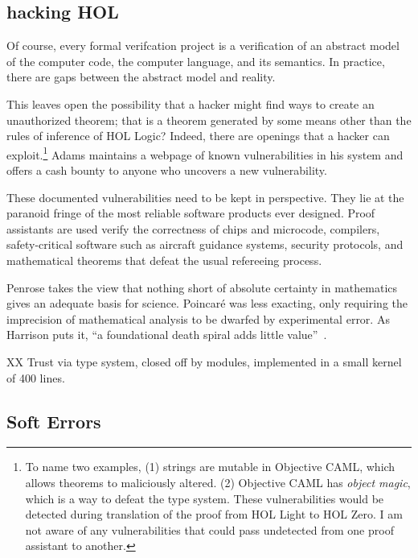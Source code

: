 \documentclass{llncs}
\begin{document}
\subsection{hacking HOL}

Of course, every formal verifcation project is a verification of an
abstract model of the computer code, the computer language, and its
semantics.  In practice, there are gaps between the abstract
model and reality.

  
This leaves open the possibility that a hacker might find ways to
create an unauthorized theorem; that is a theorem generated by some
means other than the rules of inference of HOL Logic?  Indeed, there
are openings that a hacker can exploit.\footnote{To name two examples,
  (1) strings are mutable in Objective CAML, which allows theorems to
  maliciously altered.  (2) Objective CAML has {\it object magic},
  which is a way to defeat the type system.  These vulnerabilities
  would be detected during translation of the proof from HOL Light to
  HOL Zero.  I am not aware of any vulnerabilities that could pass
  undetected from one proof assistant to another.}  Adams maintains a
webpage of known vulnerabilities in his system and offers a cash
bounty to anyone who uncovers a new vulnerability.

These documented vulnerabilities need to be kept in perspective.  They
lie at the paranoid fringe of the most reliable software products ever
designed. Proof assistants are used verify the correctness of chips
and microcode, compilers, safety-critical software such as aircraft
guidance systems, security protocols, and mathematical theorems that
defeat the usual refereeing process.  

Penrose takes the view that nothing short of absolute certainty in
mathematics gives an adequate basis for science.  Poincar\'e was less
exacting, only requiring the imprecision of mathematical analysis to be
dwarfed by experimental error.  As Harrison puts it, 
``a foundational death spiral adds little value''~\cite{harrison-pm}.



XX Trust via type system, closed off by modules, implemented in a small
kernel of 400 lines.


\subsection{Soft Errors}\label{sec:soft}
\end{document}

